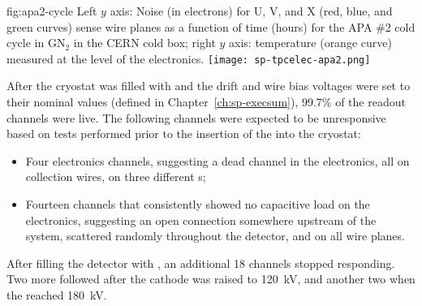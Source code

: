 \begin{dunefigure}
{fig:apa2-cycle}
{Left $y$ axis: Noise (in electrons) for U, V, and X (red, blue, and green 
curves) sense wire planes as a function of time (hours) for the APA \#2 cold 
cycle in GN$_2$ in the CERN cold box; right $y$ axis: temperature 
(orange curve) measured at the level of the  electronics.}
\texttt{[image: sp-tpcelec-apa2.png]}
\end{dunefigure}
After the cryostat was filled with  and the drift and wire 
bias voltages were set to their nominal values (defined in Chapter~\ref{ch:sp-execsum}), 
99.7\% of the  readout channels were live. %
The following 
channels were expected to be unresponsive %
based on tests performed prior to the insertion of the  into
the cryostat:
\begin{itemize}
\item{Four electronics channels, suggesting a dead channel in the electronics, 
all on collection wires, on three different s;}
\item{ %
Fourteen channels that consistently showed no capacitive load  
on the  electronics, suggesting an open connection somewhere upstream %
of the  system, scattered randomly throughout the detector, 
and on all wire planes.}
\end{itemize}

\begin{comment}  No need for itemizing here (anne)
Two additional sets of channels were observed to be non-responsive
after filling the detector with \lar:
\begin{itemize}
\item{An additional 18 channels were found to be non-responsive
immediately after the \lar filling was complete;}
\item{Two more channels became non-responsive after the cathode
high voltage was raised to \SI{120}{kV}, and two more
when the high voltage reached \SI{180}{kV}.}
\end{itemize}
\end{comment}
After filling the detector with \lar{}, an additional 18 channels stopped responding. Two more  followed  after the cathode  was raised to \SI{120}{kV}, and another two when the   reached \SI{180}{kV}.




